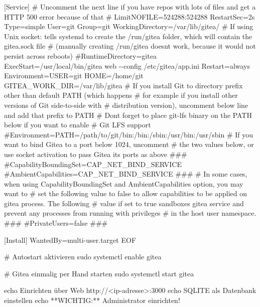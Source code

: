\documentclass[
  letterpaper,
  DIV=11]{scrreprt}
\newenvironment{Shaded}{\begin{snugshade}}{\end{snugshade}}
\newcommand{\BuiltInTok}[1]{\textcolor[rgb]{0.00,0.23,0.31}{#1}}
\newcommand{\CommentTok}[1]{\textcolor[rgb]{0.37,0.37,0.37}{#1}}
\newcommand{\ExtensionTok}[1]{\textcolor[rgb]{0.00,0.23,0.31}{#1}}
\newcommand{\FunctionTok}[1]{\textcolor[rgb]{0.28,0.35,0.67}{#1}}
\newcommand{\KeywordTok}[1]{\textcolor[rgb]{0.00,0.23,0.31}{\textbf{#1}}}
\newcommand{\NormalTok}[1]{\textcolor[rgb]{0.00,0.23,0.31}{#1}}
\newcommand{\OperatorTok}[1]{\textcolor[rgb]{0.37,0.37,0.37}{#1}}
\newcommand{\PreprocessorTok}[1]{\textcolor[rgb]{0.68,0.00,0.00}{#1}}
\newcommand{\StringTok}[1]{\textcolor[rgb]{0.13,0.47,0.30}{#1}}
\begin{document}
\begin{Shaded}
\begin{Highlighting}[]
\StringTok{[Service]}
\StringTok{\# Uncomment the next line if you have repos with lots of files and get a HTTP 500 error because of that}
\StringTok{\# LimitNOFILE=524288:524288}
\StringTok{RestartSec=2s}
\StringTok{Type=simple}
\StringTok{User=git}
\StringTok{Group=git}
\StringTok{WorkingDirectory=/var/lib/gitea/}
\StringTok{\# If using Unix socket: tells systemd to create the /run/gitea folder, which will contain the gitea.sock file}
\StringTok{\# (manually creating /run/gitea doesn\textquotesingle{}t work, because it would not persist across reboots)}
\StringTok{\#RuntimeDirectory=gitea}
\StringTok{ExecStart=/usr/local/bin/gitea web {-}{-}config /etc/gitea/app.ini}
\StringTok{Restart=always}
\StringTok{Environment=USER=git HOME=/home/git GITEA\_WORK\_DIR=/var/lib/gitea}
\StringTok{\# If you install Git to directory prefix other than default PATH (which happens}
\StringTok{\# for example if you install other versions of Git side{-}to{-}side with}
\StringTok{\# distribution version), uncomment below line and add that prefix to PATH}
\StringTok{\# Don\textquotesingle{}t forget to place git{-}lfs binary on the PATH below if you want to enable}
\StringTok{\# Git LFS support}
\StringTok{\#Environment=PATH=/path/to/git/bin:/bin:/sbin:/usr/bin:/usr/sbin}
\StringTok{\# If you want to bind Gitea to a port below 1024, uncomment}
\StringTok{\# the two values below, or use socket activation to pass Gitea its ports as above}
\StringTok{\#\#\#}
\StringTok{\#CapabilityBoundingSet=CAP\_NET\_BIND\_SERVICE}
\StringTok{\#AmbientCapabilities=CAP\_NET\_BIND\_SERVICE}
\StringTok{\#\#\#}
\StringTok{\# In some cases, when using CapabilityBoundingSet and AmbientCapabilities option, you may want to}
\StringTok{\# set the following value to false to allow capabilities to be applied on gitea process. The following}
\StringTok{\# value if set to true sandboxes gitea service and prevent any processes from running with privileges}
\StringTok{\# in the host user namespace.}
\StringTok{\#\#\#}
\StringTok{\#PrivateUsers=false}
\StringTok{\#\#\#}

\StringTok{[Install]}
\StringTok{WantedBy=multi{-}user.target}
\OperatorTok{EOF}

\CommentTok{\# Autostart aktivieren}
\FunctionTok{sudo}\NormalTok{ systemctl enable gitea}

\CommentTok{\# Gitea einmalig per Hand starten}
\FunctionTok{sudo}\NormalTok{ systemctl start gitea}

\BuiltInTok{echo}\NormalTok{ Einrichten über Web  }\KeywordTok{\textasciigrave{}}\ExtensionTok{http://}\OperatorTok{\textless{}}\NormalTok{ip{-}adresse}\OperatorTok{\textgreater{}}\NormalTok{:3000}\KeywordTok{\textasciigrave{}}  
\BuiltInTok{echo}\NormalTok{ SQLITE als Datenbank einstellen}
\BuiltInTok{echo} \PreprocessorTok{**}\NormalTok{WICHTIG:}\PreprocessorTok{**}\NormalTok{ Administrator einrichten!}
\end{Highlighting}
\end{Shaded}
\end{document}
